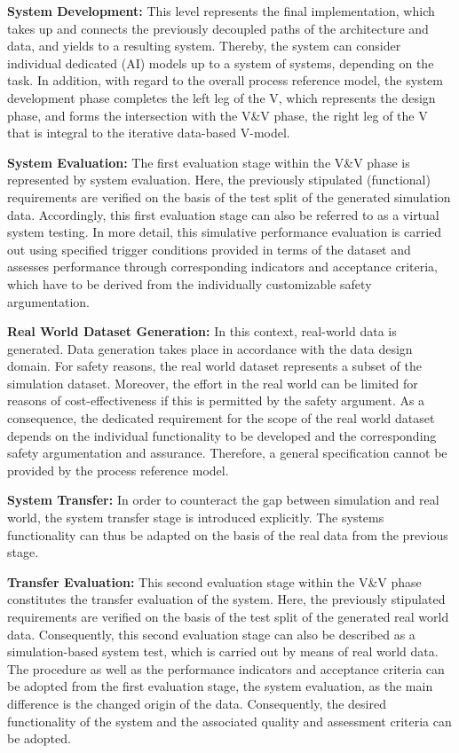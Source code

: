 \textbf{System Development:}  This level represents the final implementation, which takes up and connects the previously decoupled paths of the architecture and data, and yields to a resulting system. Thereby, the system can consider individual dedicated (AI) models up to a system of systems, depending on the task. In addition, with regard to the overall process reference model, the system development phase completes the left leg of the V, which represents the design phase, and forms the intersection with the V\&V phase, the right leg of the V that is integral to the iterative data-based V-model.

\textbf{System Evaluation:} The first evaluation stage within the V\&V phase is represented by system evaluation. Here, the previously stipulated (functional) requirements are verified on the basis of the test split of the generated simulation data. Accordingly, this first evaluation stage can also be referred to as a virtual system testing. In more detail, this simulative performance evaluation is carried out using specified trigger conditions provided in terms of the dataset and assesses performance through corresponding indicators and acceptance criteria, which have to be derived from the individually customizable safety argumentation. 

\textbf{Real World Dataset Generation:} In this context, real-world data is generated. Data generation takes place in accordance with the data design domain. For safety reasons, the real world dataset represents a subset of the simulation dataset. Moreover, the effort in the real world can be limited for reasons of cost-effectiveness if this is permitted by the safety argument. As a consequence, the dedicated requirement for the scope of the real world dataset depends on the individual functionality to be developed and the corresponding safety argumentation and assurance. Therefore, a general specification cannot be provided by the process reference model.

\textbf{System Transfer:}  In order to counteract the gap between simulation and real world, the system transfer stage is introduced explicitly. The systems functionality can thus be adapted on the basis of the real data from the previous stage.

\textbf{Transfer Evaluation:} This second evaluation stage within the V\&V phase constitutes the transfer evaluation of the system. Here, the previously stipulated requirements are verified on the basis of the test split of the generated real world data. Consequently, this second evaluation stage can also be described as a simulation-based system test, which is carried out by means of real world data. The procedure as well as the performance indicators and acceptance criteria can be adopted from the first evaluation stage, the system evaluation, as the main difference is the changed origin of the data. Consequently, the desired functionality of the system and the associated quality and assessment criteria can be adopted.

